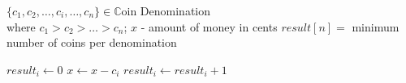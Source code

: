   \REQUIRE $\{c_1, c_2,\ldots, c_i, \ldots, c_n\} \in \mathbb{C}$oin Denomination \\
          where $c_1 > c_2 > \ldots > c_n$; $x$ - amount of money in cents
  \ENSURE $result[n] = $ minimum number of coins per denomination

     \STATE $result_i \leftarrow 0$
  	   \STATE $x \leftarrow x - c_i$ 
       \STATE $result_i \leftarrow result_i + 1$
      \ENDWHILE
  \ENDFOR
